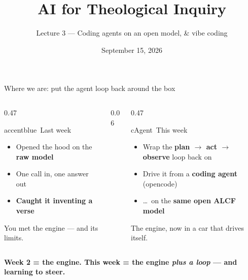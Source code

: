 


\title{AI for Theological Inquiry}
\subtitle{Lecture 3 — Coding agents on an open model, \& vibe coding}
\date{September 15, 2026}





\begin{frame}{Where we are: put the agent loop back around the box}
  \begin{columns}[c, totalwidth=\textwidth]
    \begin{column}{0.47\textwidth}
      \begin{featbox}{accentblue}{\faCheckCircle\ Last week}
        \small
        \begin{itemize}
          \item Opened the hood on the \textbf{raw model}
          \item One call in, one answer out
          \item \textbf{Caught it inventing a verse}
        \end{itemize}
        {\scriptsize\color{midgray}You met the engine --- and its limits.}
      \end{featbox}
    \end{column}
    \begin{column}{0.06\textwidth}\end{column}
    \begin{column}{0.47\textwidth}
      \begin{featbox}{cAgent}{\faRobot\ This week}
        \small
        \begin{itemize}
          \item Wrap the \textbf{plan $\to$ act $\to$ observe} loop back on
          \item Drive it from a \textbf{coding agent} (opencode)
          \item \dots\ on the \textbf{same open ALCF model}
        \end{itemize}
        {\scriptsize\color{midgray}The engine, now in a car that drives itself.}
      \end{featbox}
    \end{column}
  \end{columns}
  \vspace{10pt}
  \begin{center}\small\color{labnavy}\bfseries
    Week 2 = the engine. This week = the engine \emph{plus a loop} --- and learning to steer.\end{center}
\end{frame}

